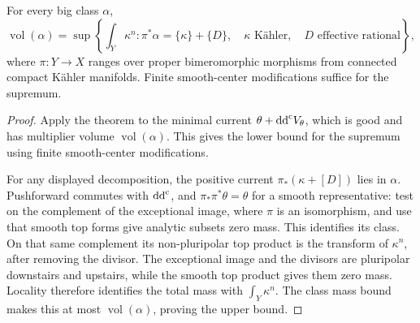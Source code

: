 \begin{corollary}\label{cor:transcendental-fujita-volume}
For every big class $\alpha$,
\[
 \operatorname{vol}(\alpha)
 =\sup\left\{\int_Y\kappa^n:
       \pi^*\alpha=\{\kappa\}+\{D\},\quad
       \kappa\text{ K\"ahler},\quad D\text{ effective rational}\right\},
\]
where $\pi:Y\to X$ ranges over proper bimeromorphic morphisms from connected compact K\"ahler manifolds. Finite smooth-center modifications suffice for the supremum.
\end{corollary}
\begin{proof}
Apply the theorem to the minimal current $\theta+\mathrm{dd}^{\mathrm{c}} V_\theta$, which is good and has multiplier volume $\operatorname{vol}(\alpha)$. This gives the lower bound for the supremum using finite smooth-center modifications.

For any displayed decomposition, the positive current $\pi_*(\kappa+[D])$ lies in $\alpha$. Pushforward commutes with $\mathrm{dd}^{\mathrm{c}}$, and $\pi_*\pi^*\theta=\theta$ for a smooth representative: test on the complement of the exceptional image, where $\pi$ is an isomorphism, and use that smooth top forms give analytic subsets zero mass. This identifies its class. On that same complement its non-pluripolar top product is the transform of $\kappa^n$, after removing the divisor. The exceptional image and the divisors are pluripolar downstairs and upstairs, while the smooth top product gives them zero mass. Locality therefore identifies the total mass with $\int_Y\kappa^n$. The class mass bound makes this at most $\operatorname{vol}(\alpha)$, proving the upper bound.
\end{proof}


